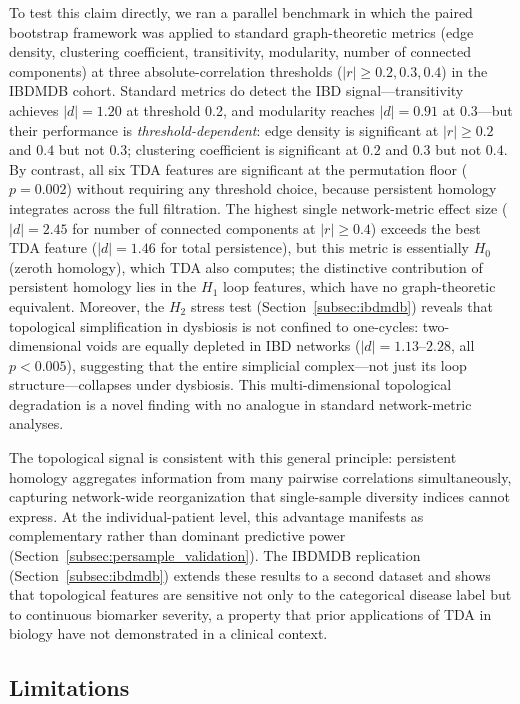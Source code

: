 To test this claim directly, we ran a parallel benchmark in which the paired
bootstrap framework was applied to standard graph-theoretic metrics (edge density,
clustering coefficient, transitivity, modularity, number of connected components)
at three absolute-correlation thresholds ($|r| \geq 0.2, 0.3, 0.4$) in the
IBDMDB cohort.
Standard metrics do detect the IBD signal---transitivity achieves $|d| = 1.20$
at threshold 0.2, and modularity reaches $|d| = 0.91$ at 0.3---but their
performance is \emph{threshold-dependent}: edge density is significant at
$|r| \geq 0.2$ and $0.4$ but not $0.3$; clustering coefficient is significant
at $0.2$ and $0.3$ but not $0.4$.
By contrast, all six TDA features are significant at the permutation floor
($p = 0.002$) without requiring any threshold choice, because persistent
homology integrates across the full filtration.
The highest single network-metric effect size ($|d| = 2.45$ for number of
connected components at $|r| \geq 0.4$) exceeds the best TDA feature
($|d| = 1.46$ for total persistence), but this metric is essentially $H_0$
(zeroth homology), which TDA also computes; the distinctive contribution of
persistent homology lies in the $H_1$ loop features, which have no
graph-theoretic equivalent.
Moreover, the $H_2$ stress test (Section~\ref{subsec:ibdmdb}) reveals
that topological simplification in dysbiosis is not confined to
one-cycles: two-dimensional voids are equally depleted in IBD networks
($|d| = 1.13$--$2.28$, all $p < 0.005$), suggesting that the entire
simplicial complex---not just its loop structure---collapses under
dysbiosis.
This multi-dimensional topological degradation is a novel finding with no
analogue in standard network-metric analyses.

The topological signal is consistent with this general principle:
persistent homology aggregates information from many pairwise correlations
simultaneously, capturing network-wide reorganization that single-sample
diversity indices cannot express.
At the individual-patient level, this advantage manifests as complementary
rather than dominant predictive power
(Section~\ref{subsec:persample_validation}).
The IBDMDB replication (Section~\ref{subsec:ibdmdb}) extends these results
to a second dataset and shows that topological features are sensitive not
only to the categorical disease label but to continuous biomarker severity,
a property that prior applications of TDA in biology have not demonstrated
in a clinical context.

\subsection{Limitations}
\label{subsec:limitations}

